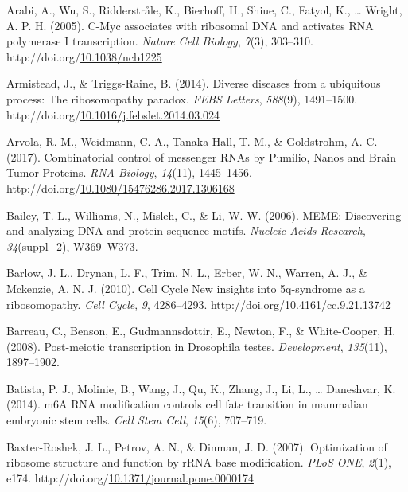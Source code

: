 \documentclass[12pt,oneside]{reedthesis}
\newlength{\cslhangindent}
\newenvironment{CSLReferences}[2] %
 {%
  \setlength{\parindent}{0pt}
  \ifodd #1 \everypar{\setlength{\hangindent}{\cslhangindent}}\ignorespaces\fi
  \ifnum #2 > 0
  \setlength{\parskip}{#2\baselineskip}
  \fi
 }%
 {}
\begin{document}
\begin{CSLReferences}{1}{0}
\leavevmode{}%
Arabi, A., Wu, S., Ridderstråle, K., Bierhoff, H., Shiue, C., Fatyol, K., \ldots{} Wright, A. P. H. (2005). C-{Myc} associates with ribosomal {DNA} and activates {RNA} polymerase {I} transcription. \emph{Nature Cell Biology}, \emph{7}(3), 303--310. http://doi.org/\href{https://doi.org/10.1038/ncb1225}{10.1038/ncb1225}

\leavevmode{}%
Armistead, J., \& Triggs-Raine, B. (2014). Diverse diseases from a ubiquitous process: {The} ribosomopathy paradox. \emph{FEBS Letters}, \emph{588}(9), 1491--1500. http://doi.org/\href{https://doi.org/10.1016/j.febslet.2014.03.024}{10.1016/j.febslet.2014.03.024}

\leavevmode{}%
Arvola, R. M., Weidmann, C. A., Tanaka Hall, T. M., \& Goldstrohm, A. C. (2017). Combinatorial control of messenger {RNAs} by {Pumilio}, {Nanos} and {Brain Tumor Proteins}. \emph{RNA Biology}, \emph{14}(11), 1445--1456. http://doi.org/\href{https://doi.org/10.1080/15476286.2017.1306168}{10.1080/15476286.2017.1306168}

\leavevmode{}%
Bailey, T. L., Williams, N., Misleh, C., \& Li, W. W. (2006). {MEME}: Discovering and analyzing {DNA} and protein sequence motifs. \emph{Nucleic Acids Research}, \emph{34}(suppl\_2), W369--W373.

\leavevmode{}%
Barlow, J. L., Drynan, L. F., Trim, N. L., Erber, W. N., Warren, A. J., \& Mckenzie, A. N. J. (2010). Cell {Cycle New} insights into 5q-syndrome as a ribosomopathy. \emph{Cell Cycle}, \emph{9}, 4286--4293. http://doi.org/\href{https://doi.org/10.4161/cc.9.21.13742}{10.4161/cc.9.21.13742}

\leavevmode{}%
Barreau, C., Benson, E., Gudmannsdottir, E., Newton, F., \& White-Cooper, H. (2008). Post-meiotic transcription in {Drosophila} testes. \emph{Development}, \emph{135}(11), 1897--1902.

\leavevmode{}%
Batista, P. J., Molinie, B., Wang, J., Qu, K., Zhang, J., Li, L., \ldots{} Daneshvar, K. (2014). {m6A RNA} modification controls cell fate transition in mammalian embryonic stem cells. \emph{Cell Stem Cell}, \emph{15}(6), 707--719.

\leavevmode{}%
Baxter-Roshek, J. L., Petrov, A. N., \& Dinman, J. D. (2007). Optimization of ribosome structure and function by {rRNA} base modification. \emph{PLoS ONE}, \emph{2}(1), e174. http://doi.org/\href{https://doi.org/10.1371/journal.pone.0000174}{10.1371/journal.pone.0000174}


\end{CSLReferences}
\end{document}
